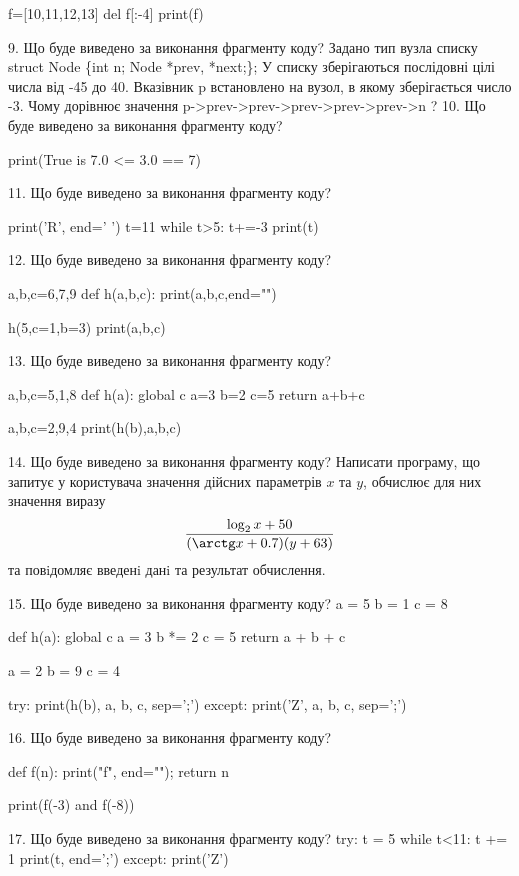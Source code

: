 \documentclass[11pt]{article}
\begin{document}
f=[10,11,12,13]
del f[:-4]
print(f)


9. Що буде виведено за виконання фрагменту коду?
Задано тип вузла списку
struct Node \{int n; Node *prev, *next;\};
У списку зберігаються послідовні цілі числа від -45 до 40. Вказівник p встановлено на вузол, в якому зберігається число -3.
Чому дорівнює значення p->prev->prev->prev->prev->prev->n ?
10. Що буде виведено за виконання фрагменту коду?

print(True is 7.0 <= 3.0 == 7)

11. Що буде виведено за виконання фрагменту коду?

print('R', end=' ')
t=11
while t>5:
    t+=-3
print(t)


12. Що буде виведено за виконання фрагменту коду?

a,b,c=6,7,9
def h(a,b,c):
    print(a,b,c,end="")

h(5,c=1,b=3)
print(a,b,c)


13. Що буде виведено за виконання фрагменту коду?

a,b,c=5,1,8
def h(a):
global c    a=3
    b=2
    c=5
    return a+b+c

a,b,c=2,9,4
print(h(b),a,b,c)

14. Що буде виведено за виконання фрагменту коду?
Написати програму, що запитує у користувача значення дійсних параметрів $x$ та $y$, обчислює для них значення виразу 
$$\frac{\log_{2} x + 50}{(\arctg x + 0.7) (y + 63)}$$ 
та повiдомляє введенi данi та результат обчислення.


15. Що буде виведено за виконання фрагменту коду?
a = 5
b = 1
c = 8

def h(a):
global c    a = 3
    b *= 2
    c = 5
    return a + b + c

a = 2
b = 9
c = 4

try:
    print(h(b), a, b, c, sep=';')
except:
    print('Z', a, b, c, sep=';')

16. Що буде виведено за виконання фрагменту коду?

def f(n):
    print("f", end="");
    return n

print(f(-3) and f(-8))

17. Що буде виведено за виконання фрагменту коду?
try:
    t = 5
    while t<11:
        t += 1
    print(t, end=';')
except:
    print('Z')
\end{document}
